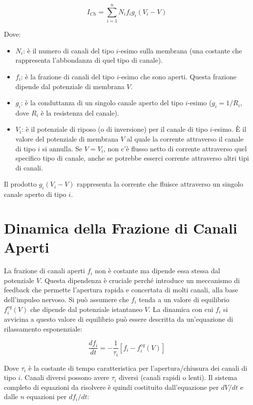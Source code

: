 \begin{equation} \label{eq:ch20_3}
I_{Ch} = \sum_{i=1}^{n} N_{i}f_{i}g_{i}(V_{i}-V)
\end{equation}

Dove:
\begin{itemize}
    \item $N_i$: è il numero di canali del tipo $i$-esimo sulla membrana (una costante che rappresenta l'abbondanza di quel tipo di canale).
    \item $f_i$: è la frazione di canali del tipo $i$-esimo che sono aperti. Questa frazione dipende dal potenziale di membrana $V$.
    \item $g_i$: è la conduttanza di un singolo canale aperto del tipo $i$-esimo ($g_i = 1/R_i$, dove $R_i$ è la resistenza del canale).
    \item $V_i$: è il potenziale di riposo (o di inversione) per il canale di tipo $i$-esimo. È il valore del potenziale di membrana $V$ al quale la corrente attraverso il canale di tipo $i$ si annulla. Se $V=V_i$, non c'è flusso netto di corrente attraverso quel specifico tipo di canale, anche se potrebbe esserci corrente attraverso altri tipi di canali.
\end{itemize}

Il prodotto $g_i(V_i-V)$ rappresenta la corrente che fluisce attraverso un singolo canale aperto di tipo $i$.


\section{Dinamica della Frazione di Canali Aperti}
La frazione di canali aperti $f_i$ non è costante ma dipende essa stessa dal potenziale $V$. Questa dipendenza è cruciale perché introduce un meccanismo di feedback che permette l'apertura rapida e concertata di molti canali, alla base dell'impulso nervoso.
Si può assumere che $f_i$ tenda a un valore di equilibrio $f_i^{eq}(V)$ che dipende dal potenziale istantaneo $V$. La dinamica con cui $f_i$ si avvicina a questo valore di equilibrio può essere descritta da un'equazione di rilassamento esponenziale:

\begin{equation} \label{eq:ch20_4}
\frac{df_{i}}{dt} = -\frac{1}{\tau_{i}}[f_{i}-f_{i}^{eq}(V)]
\end{equation}

Dove $\tau_i$ è la costante di tempo caratteristica per l'apertura/chiusura dei canali di tipo $i$. Canali diversi possono avere $\tau_i$ diversi (canali rapidi o lenti).
Il sistema completo di equazioni da risolvere è quindi costituito dall'equazione per $dV/dt$ e dalle $n$ equazioni per $df_i/dt$:

